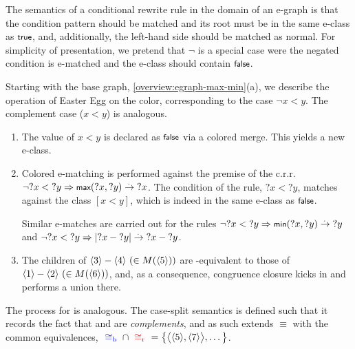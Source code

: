 The semantics of a conditional rewrite rule in the domain of an e-graph is that the condition pattern should be matched and its root must be in the same e-class as $\ttrue$, and, additionally, the left-hand side should be matched as normal.
For simplicity of presentation, we pretend that $\lnot$ is a special case were the negated condition is e-matched and the e-class should contain $\tfalse$.

\smallskip
Starting with the base graph, \autoref{overview:egraph-max-min}(a), we describe the operation of Easter Egg
on the \cred color, corresponding to the case $\lnot x < y$.
The complement \cblue case ($x < y$) is analogous.

\begin{enumerate}[leftmargin=1.5em]
\item
    The value of $x < y$ is declared as $\tfalse$ via
    a colored merge.
    This yields a new \cred e-class.
\item
    Colored e-matching is performed against the premise of the c.r.r. $\lnot {?x} < {?y} \Rightarrow \tmax({?x}, {?y}) \rwto {?x}$.
    The condition of the rule, ${?x} < {?y}$, matches against the class $[x < y]$, 
    which is indeed in the same \cred e-class as $\tfalse$.
    
    Similar e-matches are carried out for the rules
    $\lnot {?x} < {?y} \Rightarrow \tmin({?x}, {?y}) \rwto {?y}$
    and
    $\lnot {?x} < {?y} \Rightarrow |{?x} - {?y}| \overset{.\,}{\rightarrow} {?x} - {?y}$.
\item
    The children of $\langle 3\rangle - \langle 4\rangle ~(\in M(\langle 5\rangle))$ are \cred-equivalent to those of $\langle 1\rangle - \langle 2\rangle ~(\in M(\langle 6\rangle))$, and,
    as a consequence, \cred congruence closure kicks in and performs a \cred union there.
\end{enumerate}

\medskip
The process for \cblue is analogous.
The case-split semantics is defined such that it records the fact
that \cblue and \cred are \emph{complements},
and as such extends $\equiv$ with the common equivalences,
${~\color{blue}\cong_{\mathrm{b}}\,\,}\cap{~\color{red}\cong_{\mathrm{r}}\,\,} = \big\{\big\langle\langle 5\rangle,\langle 7\rangle\big\rangle, \ldots\big\}$.